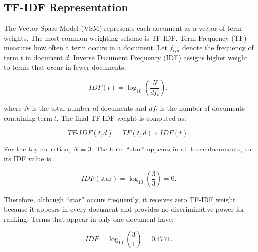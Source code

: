 \subsection{TF-IDF Representation}

The Vector Space Model (VSM) represents each document as a vector of term
weights. The most common weighting scheme is TF-IDF. Term Frequency (TF)
measures how often a term occurs in a document. Let $f_{t,d}$ denote the
frequency of term $t$ in document $d$. Inverse Document Frequency (IDF)
assigns higher weight to terms that occur in fewer documents:

\begin{equation}
IDF(t)=\log_{10}\left(\frac{N}{df_t}\right),
\end{equation}

where $N$ is the total number of documents and $df_t$ is the number of
documents containing term $t$. The final TF-IDF weight is computed as:

\begin{equation}
TF\text{-}IDF(t,d)=TF(t,d)\times IDF(t).
\end{equation}

For the toy collection, $N=3$. The term ``star'' appears in all three
documents, so its IDF value is:

\[
IDF(\text{star})=\log_{10}\left(\frac{3}{3}\right)=0.
\]

Therefore, although ``star'' occurs frequently, it receives zero TF-IDF
weight because it appears in every document and provides no discriminative
power for ranking. Terms that appear in only one document have:

\[
IDF=\log_{10}\left(\frac{3}{1}\right)=0.4771.
\]

